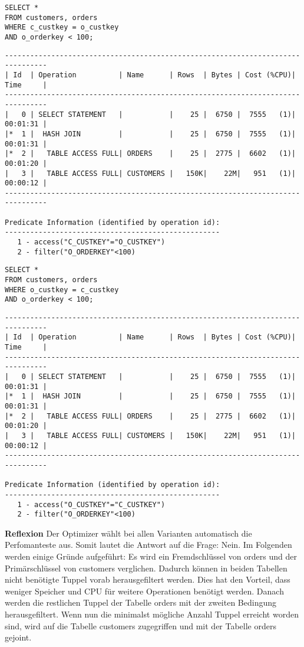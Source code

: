 \documentclass[10pt]{article}
\begin{document}
\begin{lstlisting}[style=sql]
SELECT *
FROM customers, orders
WHERE c_custkey = o_custkey
AND o_orderkey < 100;
\end{lstlisting}
\begin{lstlisting}[style=queryexecutionplan]
--------------------------------------------------------------------------------
| Id  | Operation          | Name      | Rows  | Bytes | Cost (%CPU)| Time     |
--------------------------------------------------------------------------------
|   0 | SELECT STATEMENT   |           |    25 |  6750 |  7555   (1)| 00:01:31 |
|*  1 |  HASH JOIN         |           |    25 |  6750 |  7555   (1)| 00:01:31 |
|*  2 |   TABLE ACCESS FULL| ORDERS    |    25 |  2775 |  6602   (1)| 00:01:20 |
|   3 |   TABLE ACCESS FULL| CUSTOMERS |   150K|    22M|   951   (1)| 00:00:12 |
--------------------------------------------------------------------------------

Predicate Information (identified by operation id):
---------------------------------------------------
   1 - access("C_CUSTKEY"="O_CUSTKEY")
   2 - filter("O_ORDERKEY"<100)
\end{lstlisting}
\begin{lstlisting}[style=sql]
SELECT *
FROM customers, orders
WHERE o_custkey = c_custkey
AND o_orderkey < 100;
\end{lstlisting}
\begin{lstlisting}[style=queryexecutionplan]
--------------------------------------------------------------------------------
| Id  | Operation          | Name      | Rows  | Bytes | Cost (%CPU)| Time     |
--------------------------------------------------------------------------------
|   0 | SELECT STATEMENT   |           |    25 |  6750 |  7555   (1)| 00:01:31 |
|*  1 |  HASH JOIN         |           |    25 |  6750 |  7555   (1)| 00:01:31 |
|*  2 |   TABLE ACCESS FULL| ORDERS    |    25 |  2775 |  6602   (1)| 00:01:20 |
|   3 |   TABLE ACCESS FULL| CUSTOMERS |   150K|    22M|   951   (1)| 00:00:12 |
--------------------------------------------------------------------------------

Predicate Information (identified by operation id):
---------------------------------------------------
   1 - access("O_CUSTKEY"="C_CUSTKEY")
   2 - filter("O_ORDERKEY"<100)
\end{lstlisting}
\textbf{Reflexion} \newline
Der Optimizer wählt bei allen Varianten automatisch die Perfomanteste aus. Somit lautet die Antwort auf die Frage: Nein.
Im Folgenden werden einige Gründe aufgeführt:
Es wird ein Fremdschlüssel von orders und der Primärschlüssel von customers verglichen.
Dadurch können in beiden Tabellen nicht benötigte Tuppel vorab herausgefiltert werden.
Dies hat den Vorteil, dass weniger Speicher und CPU für weitere Operationen benötigt werden.
Danach werden die restlichen Tuppel der Tabelle orders mit der zweiten Bedingung herausgefiltert.
Wenn nun die minimalst mögliche Anzahl Tuppel erreicht worden sind, wird auf die Tabelle
customers zugegriffen und mit der Tabelle orders gejoint.
\end{document}
